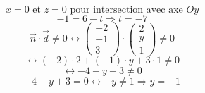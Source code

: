 \documentclass{article}
\begin{document}
\[ x=0 \text{ et } z=0 \text{ pour intersection avec axe } Oy \]
\[ -1 = 6 - t \Rightarrow t = -7\]
\[ \vec{n} \cdot \vec{d} \neq 0 \leftrightarrow \begin{pmatrix} -2 \\ -1 \\ 3 \end{pmatrix} \cdot \begin{pmatrix} 2 \\ y \\ 1 \end{pmatrix} \neq 0 \]
\[ \leftrightarrow (-2) \cdot 2 + (-1) \cdot y + 3 \cdot 1 \neq 0 \]
\[ \leftrightarrow -4 - y + 3 \neq 0 \]
\[ -4 - y + 3 = 0 \leftrightarrow -y \neq 1 \Rightarrow y = -1 \]
\end{document}
